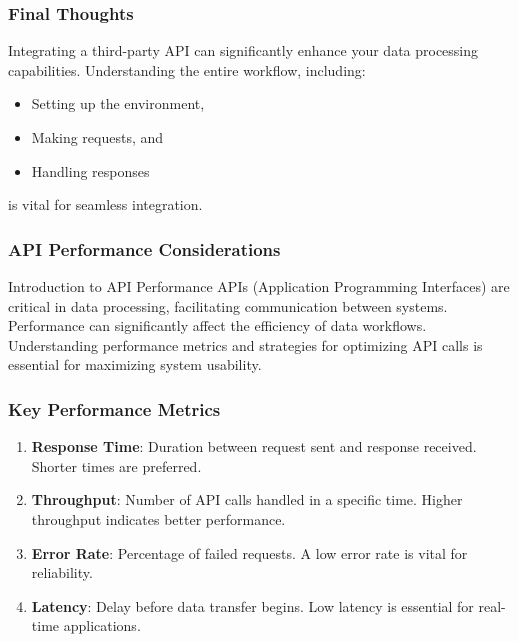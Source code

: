 \documentclass[aspectratio=169]{beamer}
\begin{document}
\begin{frame}
  \frametitle{Final Thoughts}
  Integrating a third-party API can significantly enhance your data processing capabilities. Understanding the entire workflow, including:
  \begin{itemize}
    \item Setting up the environment,
    \item Making requests, and
    \item Handling responses
  \end{itemize}
  is vital for seamless integration.
\end{frame}

\begin{frame}[fragile]
    \frametitle{API Performance Considerations}
    \begin{block}{Introduction to API Performance}
        APIs (Application Programming Interfaces) are critical in data processing, facilitating communication between systems. 
        Performance can significantly affect the efficiency of data workflows. Understanding performance metrics and strategies for optimizing API calls is essential for maximizing system usability.
    \end{block}
\end{frame}

\begin{frame}[fragile]
    \frametitle{Key Performance Metrics}
    \begin{enumerate}
        \item \textbf{Response Time}: Duration between request sent and response received. Shorter times are preferred.
        \item \textbf{Throughput}: Number of API calls handled in a specific time. Higher throughput indicates better performance.
        \item \textbf{Error Rate}: Percentage of failed requests. A low error rate is vital for reliability.
        \item \textbf{Latency}: Delay before data transfer begins. Low latency is essential for real-time applications.
    \end{enumerate}
\end{frame}
\end{document}
